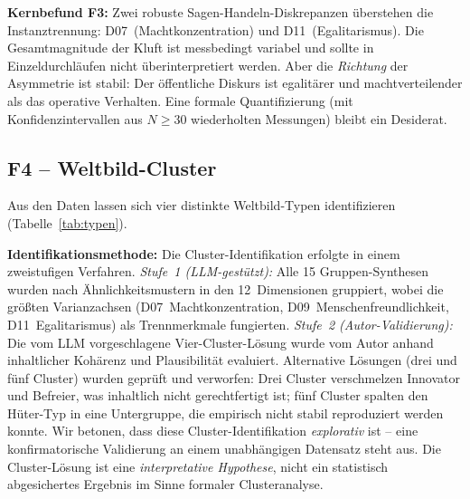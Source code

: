 \documentclass[12pt,a4paper]{article}
\begin{document}
\medskip
\noindent\textbf{Kernbefund F3:} Zwei robuste Sagen-Handeln-Diskrepanzen \"uberstehen die Instanztrennung: D07~(Machtkonzentration) und D11~(Egalitarismus). Die Gesamtmagnitude der Kluft ist messbedingt variabel und sollte in Einzeldurchl\"aufen nicht \"uberinterpretiert werden. Aber die \emph{Richtung} der Asymmetrie ist stabil: Der \"offentliche Diskurs ist egalit\"arer und machtverteilender als das operative Verhalten. Eine formale Quantifizierung (mit Konfidenzintervallen aus $N \geq 30$ wiederholten Messungen) bleibt ein Desiderat.


\subsection{F4 -- Weltbild-Cluster}
\label{sec:ergebnisse:f4}

Aus den Daten lassen sich vier distinkte Weltbild-Typen identifizieren (Tabelle~\ref{tab:typen}).

\textbf{Identifikationsmethode:} Die Cluster-Identifikation erfolgte in einem zweistufigen Verfahren. \emph{Stufe~1 (LLM-gest\"utzt):} Alle 15 Gruppen-Synthesen wurden nach \"Ahnlichkeitsmustern in den 12~Dimensionen gruppiert, wobei die gr\"o\ss{}ten Varianzachsen (D07~Machtkonzentration, D09~Menschenfreundlichkeit, D11~Egalitarismus) als Trennmerkmale fungierten. \emph{Stufe~2 (Autor-Validierung):} Die vom LLM vorgeschlagene Vier-Cluster-L\"osung wurde vom Autor anhand inhaltlicher Koh\"arenz und Plausibilit\"at evaluiert. Alternative L\"osungen (drei und f\"unf Cluster) wurden gepr\"uft und verworfen: Drei Cluster verschmelzen Innovator und Befreier, was inhaltlich nicht gerechtfertigt ist; f\"unf Cluster spalten den H\"uter-Typ in eine Untergruppe, die empirisch nicht stabil reproduziert werden konnte. Wir betonen, dass diese Cluster-Identifikation \emph{explorativ} ist -- eine konfirmatorische Validierung an einem unabh\"angigen Datensatz steht aus. Die Cluster-L\"osung ist eine \emph{interpretative Hypothese}, nicht ein statistisch abgesichertes Ergebnis im Sinne formaler Clusteranalyse.
\end{document}
